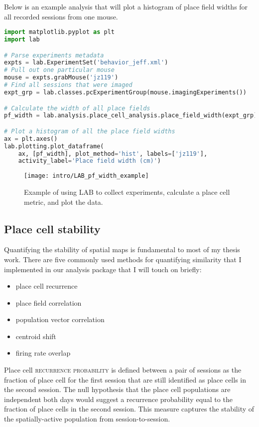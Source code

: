 Below is an example analysis that will plot a histogram of place field widths for all recorded sessions from one mouse.

\begin{lstlisting}[language=Python]
import matplotlib.pyplot as plt
import lab

# Parse experiments metadata
expts = lab.ExperimentSet('behavior_jeff.xml')
# Pull out one particular mouse
mouse = expts.grabMouse('jz119')
# Find all sessions that were imaged
expt_grp = lab.classes.pcExperimentGroup(mouse.imagingExperiments())

# Calculate the width of all place fields
pf_width = lab.analysis.place_cell_analysis.place_field_width(expt_grp)

# Plot a histogram of all the place field widths
ax = plt.axes()
lab.plotting.plot_dataframe(
	ax, [pf_width], plot_method='hist', labels=['jz119'],
	activity_label='Place field width (cm)')

\end{lstlisting}

\begin{figure}[!h]
	\centering
	\texttt{[image: intro/LAB\_pf\_width\_example]}
	\caption[Example histogram]{Example of using LAB to collect experiments, calculate a place cell metric, and plot the data.}
	\label{fig:intro:techniques:pf_width}
\end{figure}


\subsection{Place cell stability}
\label{sec:intro:techniques:stability}
Quantifying the stability of spatial maps is fundamental to most of my thesis work.
There are five commonly used methods for quantifying similarity that I implemented in our analysis package that I will touch on briefly:
\begin{itemize}
	\item{place cell recurrence}
	\item{place field correlation}
	\item{population vector correlation}
	\item{centroid shift}
	\item{firing rate overlap}
\end{itemize}

Place cell \textsc{recurrence probability} is defined between a pair of sessions as the fraction of place cell for the first session that are still identified as place cells in the second session. The null hypothesis that the place cell populations are independent both days would suggest a recurrence probability equal to the fraction of place cells in the second session. This measure captures the stability of the spatially-active population from session-to-session.

